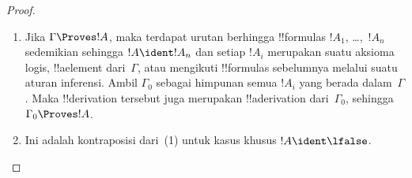 \documentclass[../../../include/open-logic-section]{subfiles}
\begin{document}
\begin{proof}
  \begin{enumerate}
    \item Jika $\Gamma \Proves !A$, maka terdapat urutan berhingga
      !!{formula}s $!A_1$, \dots,~$!A_n$ sedemikian sehingga
      $!A \ident !A_n$ dan setiap $!A_i$ merupakan suatu aksioma logis,
      !!a{element} dari~$\Gamma$, atau mengikuti !!{formula}s sebelumnya
      melalui suatu aturan inferensi. Ambil $\Gamma_0$ sebagai himpunan semua
      $!A_i$ yang berada dalam~$\Gamma$. Maka !!{derivation} tersebut
      juga merupakan !!a{derivation} dari~$\Gamma_0$, sehingga
      $\Gamma_0 \Proves !A$.
    \item Ini adalah kontraposisi dari~(1) untuk kasus khusus
      $!A \ident \lfalse$.
\end{enumerate}
\end{proof}
\end{document}
